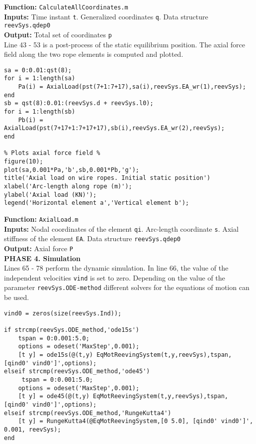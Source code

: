 \setlength{\parindent}{0cm}
\textbf{Function:} \texttt{CalculateAllCoordinates.m} \\
\textbf{Inputs:} Time instant \texttt{t}. Generalized coordinates \texttt{q}. Data structure \texttt{reevSys.qdep0} \\
\textbf{Output:} Total set of coordinates \texttt{p} \\

Line 43 - 53 is a post-process of the static equilibrium position. The axial force field along the two rope elements is computed and plotted.

\begin{tcolorbox}{\begin{lstlisting}[style=Matlab-editor]
% Calculation of axial force field along rope %
sa = 0:0.01:qst(8);
for i = 1:length(sa)
    Pa(i) = AxialLoad(pst(7+1:7+17),sa(i),reevSys.EA_wr(1),reevSys);
end
sb = qst(8):0.01:(reevSys.d + reevSys.l0);
for i = 1:length(sb)
    Pb(i) = AxialLoad(pst(7+17+1:7+17+17),sb(i),reevSys.EA_wr(2),reevSys);
end

% Plots axial force field %
figure(10);
plot(sa,0.001*Pa,'b',sb,0.001*Pb,'g');
title('Axial load on wire ropes. Initial static position')
xlabel('Arc-length along rope (m)');
ylabel('Axial load (KN)');
legend('Horizontal element a','Vertical element b');
\end{lstlisting}}
\end{tcolorbox}

\setlength{\parindent}{0cm}
\textbf{Function:} \texttt{AxialLoad.m} \\
\textbf{Inputs:} Nodal coordinates of the element \texttt{qi}. Arc-length coordinate \texttt{s}. Axial stiffness of the element \texttt{EA}. Data structure \texttt{reevSys.qdep0} \\
\textbf{Output:} Axial force \texttt{P} \\

\textbf{PHASE 4. Simulation} \\

Lines 65 - 78 perform the dynamic simulation. In line 66, the value of the independent velocities \texttt{vind} is set to zero. Depending on the value of the parameter \texttt{reevSys.ODE-method} different solvers for the equations of motion can be used.

\begin{tcolorbox}{\begin{lstlisting}[style=Matlab-editor]
% Initial value of independent velocities %
vind0 = zeros(size(reevSys.Ind));

if strcmp(reevSys.ODE_method,'ode15s')
    tspan = 0:0.001:5.0;
    options = odeset('MaxStep',0.001);
    [t y] = ode15s(@(t,y) EqMotReevingSystem(t,y,reevSys),tspan, [qind0' vind0']',options);
elseif strcmp(reevSys.ODE_method,'ode45')
     tspan = 0:0.001:5.0;
    options = odeset('MaxStep',0.001);
    [t y] = ode45(@(t,y) EqMotReevingSystem(t,y,reevSys),tspan, [qind0' vind0']',options);
elseif strcmp(reevSys.ODE_method,'RungeKutta4')
    [t y] = RungeKutta4(@EqMotReevingSystem,[0 5.0], [qind0' vind0']', 0.001, reevSys);
end
\end{lstlisting}}
\end{tcolorbox}

